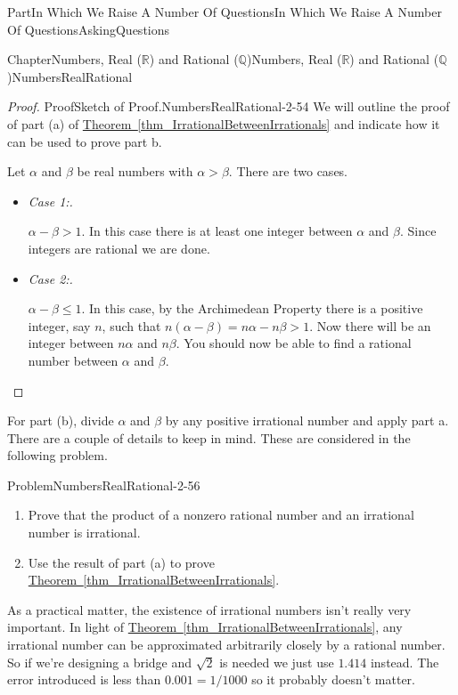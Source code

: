 \documentclass[oneside,10pt,]{book}
\newcommand{\xreffont}{\relax}
\newcommand{\lititle}[1]{{\slshape#1}}
\numberwithin{equation}{part}
\newcommand{\RR}{\mathbb {R}}
\newcommand{\QQ}{\mathbb {Q}}
\begin{document}
\begin{partptx}{Part}{In Which We Raise A Number Of Questions}{}{In Which We Raise A Number Of Questions}{}{}{AskingQuestions}
\begin{chapterptx}{Chapter}{Numbers, Real (\(\RR\)) and Rational (\(\QQ\))}{}{Numbers, Real (\(\RR\)) and Rational (\(\QQ\))}{}{}{NumbersRealRational}
\begin{introduction}{}
\begin{proof}{Proof}{Sketch of Proof.}{NumbersRealRational-2-54}
We will outline the proof of part (a) of \hyperref[thm_IrrationalBetweenIrrationals]{Theorem~{\xreffont\ref{thm_IrrationalBetweenIrrationals}}} and indicate how it can be used to prove part b.%
\par
Let \(\alpha\) and \(\beta\) be real numbers with \(\alpha > \beta\). There are two cases.%
\begin{itemize}[label=\textbullet]
\item{}\lititle{Case 1:.}\par%
\(\alpha-\beta > 1\). In this case there is at least one integer between \(\alpha\) and \(\beta\). Since integers are rational we are done.%
\item{}\lititle{Case 2:.}\par%
\(\alpha-\beta \le 1\).  In this case, by the Archimedean Property there is a positive integer, say \(n\), such that \(n(\alpha-\beta) = n\alpha-n\beta
> 1\).  Now there will be an integer between \(n\alpha\) and \(n\beta\).  You should now be able to find a rational number between \(\alpha\) and \(\beta\).%
\end{itemize}
%
\end{proof}
For part (b), divide \(\alpha\) and \(\beta\) by any positive irrational number and apply part a.  There are a couple of details to keep in mind.  These are considered in the following problem.%
\begin{problem}{Problem}{}{NumbersRealRational-2-56}%
\begin{enumerate}[font=\bfseries,label=(\alph*),ref=\alph*]%
\item{}Prove that the product of a nonzero rational number and an irrational number is irrational.%
\item{}Use the result of part (a) to prove \hyperref[thm_IrrationalBetweenIrrationals]{Theorem~{\xreffont\ref{thm_IrrationalBetweenIrrationals}}}.%
\end{enumerate}%
\end{problem}
As a practical matter, the existence of irrational numbers isn't really very important.  In light of \hyperref[thm_IrrationalBetweenIrrationals]{Theorem~{\xreffont\ref{thm_IrrationalBetweenIrrationals}}}, any irrational number can be approximated arbitrarily closely by a rational number.  So if we're designing a bridge and \(\sqrt{2}\) is needed we just use \(1.414\) instead.  The error introduced is less than \(0.001 =1/1000\) so it probably doesn't matter.%
\par

\end{introduction}
\end{chapterptx}
\end{partptx}
\end{document}
